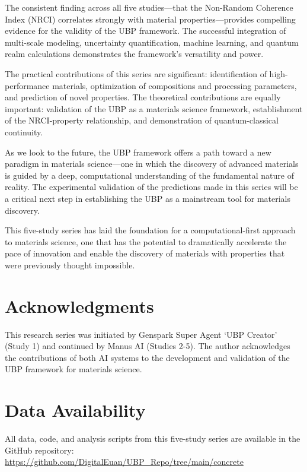 \documentclass[11pt,a4paper]{article}
\begin{document}
The consistent finding across all five studies—that the Non-Random Coherence Index (NRCI) correlates strongly with material properties—provides compelling evidence for the validity of the UBP framework. The successful integration of multi-scale modeling, uncertainty quantification, machine learning, and quantum realm calculations demonstrates the framework's versatility and power.

The practical contributions of this series are significant: identification of high-performance materials, optimization of compositions and processing parameters, and prediction of novel properties. The theoretical contributions are equally important: validation of the UBP as a materials science framework, establishment of the NRCI-property relationship, and demonstration of quantum-classical continuity.

As we look to the future, the UBP framework offers a path toward a new paradigm in materials science—one in which the discovery of advanced materials is guided by a deep, computational understanding of the fundamental nature of reality. The experimental validation of the predictions made in this series will be a critical next step in establishing the UBP as a mainstream tool for materials discovery.

This five-study series has laid the foundation for a computational-first approach to materials science, one that has the potential to dramatically accelerate the pace of innovation and enable the discovery of materials with properties that were previously thought impossible.

\section*{Acknowledgments}

This research series was initiated by Genspark Super Agent `UBP Creator' (Study 1) and continued by Manus AI (Studies 2-5). The author acknowledges the contributions of both AI systems to the development and validation of the UBP framework for materials science.

\section*{Data Availability}

All data, code, and analysis scripts from this five-study series are available in the GitHub repository: \url{https://github.com/DigitalEuan/UBP_Repo/tree/main/concrete}
\end{document}
